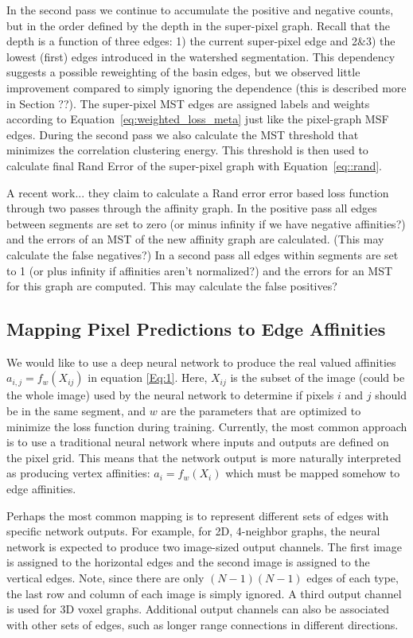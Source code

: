 \documentclass[letterpaper,twocolumn,fleqn]{article}
\begin{document}
In the second pass we continue to accumulate the positive and negative counts, but in the order defined by the depth in the super-pixel graph. Recall that the depth is a function of three edges: 1) the current super-pixel edge and 2\&3) the lowest (first) edges introduced in the watershed segmentation. This dependency suggests a possible reweighting of the basin edges, but we observed little improvement compared to simply ignoring the dependence (this is described more in Section ??). The super-pixel MST edges are assigned labels and weights according to Equation~\ref{eq:weighted_loss_meta} just like the pixel-graph MSF edges. During the second pass we also calculate the MST threshold that minimizes the correlation clustering energy. This threshold is then used to calculate final Rand Error of the super-pixel graph with Equation~\ref{eq::rand}. 

A recent work...  \cite{Turaga19} they claim to calculate a Rand error error based loss function through two passes through the affinity graph. In the positive pass all edges between segments are set to zero (or minus infinity if we have negative affinities?) and the errors of an MST of the new affinity graph are calculated. (This may calculate the false negatives?)  In a second pass all edges within segments are set to 1 (or plus infinity if affinities aren't normalized?) and the errors for an MST for this graph are computed. This may calculate the false positives? 


\subsection{Mapping Pixel Predictions to Edge Affinities}
\label{subsec:mapping}

We would like to use a deep neural network to produce the real valued affinities $a_{i,j}=f_w(X_{ij})$ in equation \ref{Eq:1}. Here, $X_{ij}$ is the subset of the image (could be the whole image) used by the neural network to determine if pixels $i$ and $j$ should be in the same segment, and $w$ are the parameters that are optimized to minimize the loss function during training. Currently, the most common approach is to use a traditional neural network where inputs and outputs are defined on the pixel grid. This means that the network output is more naturally interpreted as producing vertex affinities: $a_{i}=f_w(X_{i})$ which must be mapped somehow to edge affinities. 

Perhaps the most common mapping is to represent different sets of edges with specific network outputs. For example, for 2D, 4-neighbor graphs, the neural network is expected to produce two image-sized output channels. The first image is assigned to the horizontal edges and the second image is assigned to the vertical edges. Note, since there are only $(N-1)(N-1)$ edges of each type, the last row and column of each image is simply ignored. A third output channel is used for 3D voxel graphs. Additional output channels can also be associated with other sets of edges, such as longer range connections in different directions.
\end{document}
